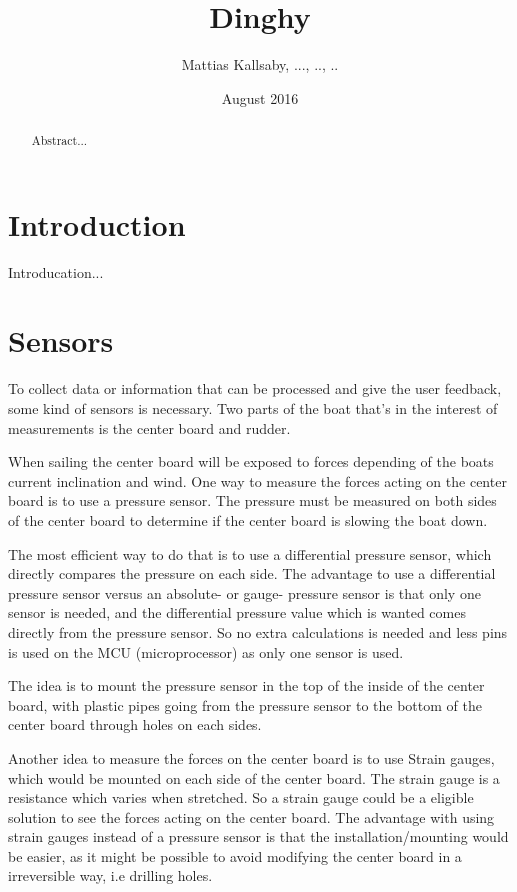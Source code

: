 ﻿\documentclass{article}
\title{Dinghy}
\author{Mattias Kallsaby, ..., .., .. }
\date{August 2016}
\begin{document}
\maketitle

\begin{abstract}
Abstract...
\end{abstract}


\section{Introduction}
Introducation...

\section{Sensors}
To collect data or information that can be processed and give the user feedback, some kind of sensors is necessary. Two parts of the boat that's in the interest of measurements is the center board and rudder. 

When sailing the center board will be exposed to forces depending of the boats current inclination and wind. One way to measure the forces acting on the center board is to use a pressure sensor. The pressure must be measured on both sides of the center board to determine if the center board is slowing the boat down. 

The most efficient way to do that is to use a differential pressure sensor, which directly compares the pressure on each side. The advantage to use a differential pressure sensor versus an absolute- or gauge- pressure sensor is that only one sensor is needed, and the differential pressure value which is wanted comes directly from the pressure sensor. So no extra calculations is needed and less pins is used on the MCU (microprocessor) as only one sensor is used. 

The idea is to mount the pressure sensor in the top of the inside of the center board, with plastic pipes going from the pressure sensor to the bottom of the center board through holes on each sides.

Another idea to measure the forces on the center board is to use Strain gauges, which would be mounted on each side of the center board. The strain gauge is a resistance which varies when stretched. So a strain gauge could be a eligible solution to see the forces acting on the center board. The advantage with using strain gauges instead of a pressure sensor is that the installation/mounting would be easier, as it might be possible to avoid modifying the center board in a irreversible way, i.e drilling holes. 
\end{document}
